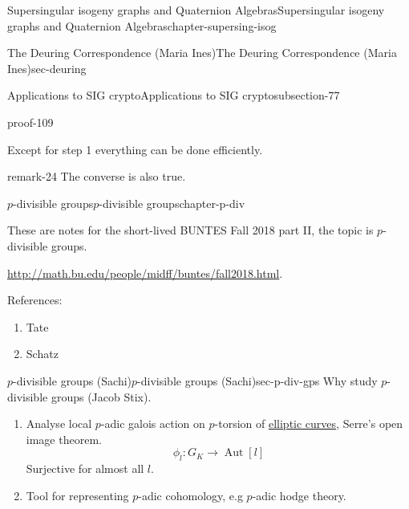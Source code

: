 \documentclass[oneside,10pt,]{book}
\numberwithin{equation}{section}
\newcommand{\lb}{[}
\newcommand{\rb}{]}
\DeclareMathOperator{\Aut}{Aut}
\begin{document}
\begin{chapterptx}{Supersingular isogeny graphs and Quaternion Algebras}{}{Supersingular isogeny graphs and Quaternion Algebras}{}{}{chapter-supersing-isog}
\begin{sectionptx}{The Deuring Correspondence (Maria Ines)}{}{The Deuring Correspondence (Maria Ines)}{}{}{sec-deuring}
\begin{subsectionptx}{Applications to SIG crypto}{}{Applications to SIG crypto}{}{}{subsection-77}
\begin{proofptx}{}{proof-109}
\begin{enumerate}
\end{enumerate}
%
\par
\hypertarget{p-982}{}%
Except for step 1 everything can be done efficiently.%
\end{proofptx}
\begin{remark}{}{remark-24}%
\hypertarget{p-983}{}%
The converse is also true.%
\end{remark}
\end{subsectionptx}
\end{sectionptx}
\end{chapterptx}
%
%
\typeout{************************************************}
\typeout{************************************************}
%
\begin{chapterptx}{\(p\)-divisible groups}{}{\(p\)-divisible groups}{}{}{chapter-p-div}
\begin{introduction}{}%
\hypertarget{p-984}{}%
These are notes for the short-lived BUNTES Fall 2018 part II, the topic is \(p\)-divisible groups.%
\par
\hypertarget{p-985}{}%
\url{http://math.bu.edu/people/midff/buntes/fall2018.html}.%
\par
\hypertarget{p-986}{}%
References:\leavevmode%
\begin{enumerate}
\item\hypertarget{li-249}{}Tate%
\item\hypertarget{li-250}{}Schatz%
\end{enumerate}
%
\end{introduction}%
%
%
\typeout{************************************************}
\typeout{************************************************}
%
\begin{sectionptx}{\(p\)-divisible groups (Sachi)}{}{\(p\)-divisible groups (Sachi)}{}{}{sec-p-div-gps}
\hypertarget{p-987}{}%
Why study  \(p\)-divisible groups (Jacob Stix).\leavevmode%
\begin{enumerate}
\item\hypertarget{li-251}{}Analyse local \(p\)-adic galois action on \(p\)-torsion of \hyperref[def-supersing-isog-ec]{elliptic curves}, Serre's open image theorem.%
\begin{equation*}
\phi_l \colon G_K \to \Aut \lb l \rb
\end{equation*}
Surjective for almost all \(l\).%
\item\hypertarget{li-252}{}Tool for representing \(p\)-adic cohomology, e.g \(p\)-adic hodge theory.%

\end{enumerate}
\end{sectionptx}
\end{chapterptx}
\end{document}
